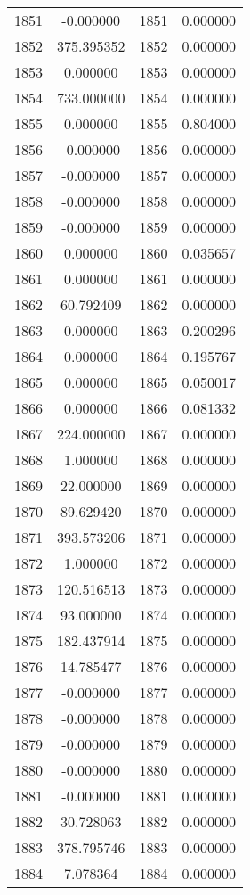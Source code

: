 \documentclass[12pt]{article}
\begin{document}
\begin{longtable}{@{}cccc@{}}
1851 & -0.000000 & 1851 & 0.000000 \\
1852 & 375.395352 & 1852 & 0.000000 \\
1853 & 0.000000 & 1853 & 0.000000 \\
1854 & 733.000000 & 1854 & 0.000000 \\
1855 & 0.000000 & 1855 & 0.804000 \\
1856 & -0.000000 & 1856 & 0.000000 \\
1857 & -0.000000 & 1857 & 0.000000 \\
1858 & -0.000000 & 1858 & 0.000000 \\
1859 & -0.000000 & 1859 & 0.000000 \\
1860 & 0.000000 & 1860 & 0.035657 \\
1861 & 0.000000 & 1861 & 0.000000 \\
1862 & 60.792409 & 1862 & 0.000000 \\
1863 & 0.000000 & 1863 & 0.200296 \\
1864 & 0.000000 & 1864 & 0.195767 \\
1865 & 0.000000 & 1865 & 0.050017 \\
1866 & 0.000000 & 1866 & 0.081332 \\
1867 & 224.000000 & 1867 & 0.000000 \\
1868 & 1.000000 & 1868 & 0.000000 \\
1869 & 22.000000 & 1869 & 0.000000 \\
1870 & 89.629420 & 1870 & 0.000000 \\
1871 & 393.573206 & 1871 & 0.000000 \\
1872 & 1.000000 & 1872 & 0.000000 \\
1873 & 120.516513 & 1873 & 0.000000 \\
1874 & 93.000000 & 1874 & 0.000000 \\
1875 & 182.437914 & 1875 & 0.000000 \\
1876 & 14.785477 & 1876 & 0.000000 \\
1877 & -0.000000 & 1877 & 0.000000 \\
1878 & -0.000000 & 1878 & 0.000000 \\
1879 & -0.000000 & 1879 & 0.000000 \\
1880 & -0.000000 & 1880 & 0.000000 \\
1881 & -0.000000 & 1881 & 0.000000 \\
1882 & 30.728063 & 1882 & 0.000000 \\
1883 & 378.795746 & 1883 & 0.000000 \\
1884 & 7.078364 & 1884 & 0.000000 \\

\end{longtable}
\end{document}
